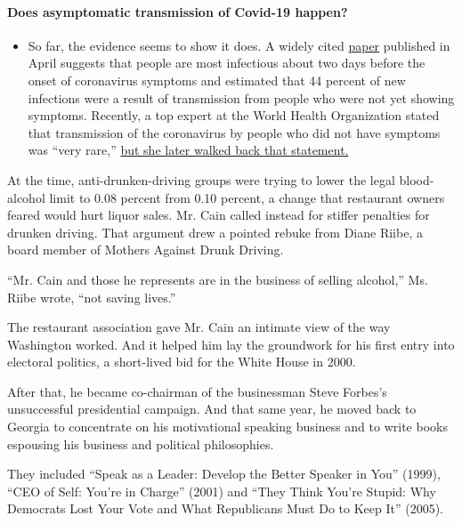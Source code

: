 \begin{itemize}
{  \paragraph{Does asymptomatic transmission of Covid-19
  happen?}\label{does-asymptomatic-transmission-of-covid-19-happen}}

  \begin{itemize}
  \tightlist
  \item
    So far, the evidence seems to show it does. A widely cited
    \href{https://www.nature.com/articles/s41591-020-0869-5}{paper}
    published in April suggests that people are most infectious about
    two days before the onset of coronavirus symptoms and estimated that
    44 percent of new infections were a result of transmission from
    people who were not yet showing symptoms. Recently, a top expert at
    the World Health Organization stated that transmission of the
    coronavirus by people who did not have symptoms was ``very rare,''
    \href{https://www.nytimes.com/2020/06/09/world/coronavirus-updates.html?action=click\&pgtype=Article\&state=default\&region=MAIN_CONTENT_3\&context=storylines_faq\#link-1f302e21}{but
    she later walked back that statement.}
  \end{itemize}
\end{itemize}

At the time, anti-drunken-driving groups were trying to lower the legal
blood-alcohol limit to 0.08 percent from 0.10 percent, a change that
restaurant owners feared would hurt liquor sales. Mr. Cain called
instead for stiffer penalties for drunken driving. That argument drew a
pointed rebuke from Diane Riibe, a board member of Mothers Against Drunk
Driving.

``Mr. Cain and those he represents are in the business of selling
alcohol,'' Ms. Riibe wrote, ``not saving lives.''

The restaurant association gave Mr. Cain an intimate view of the way
Washington worked. And it helped him lay the groundwork for his first
entry into electoral politics, a short-lived bid for the White House in
2000.

After that, he became co-chairman of the businessman Steve Forbes's
unsuccessful presidential campaign. And that same year, he moved back to
Georgia to concentrate on his motivational speaking business and to
write books espousing his business and political philosophies.

They included ``Speak as a Leader: Develop the Better Speaker in You''
(1999), ``CEO of Self: You're in Charge'' (2001) and ``They Think You're
Stupid: Why Democrats Lost Your Vote and What Republicans Must Do to
Keep It'' (2005).

